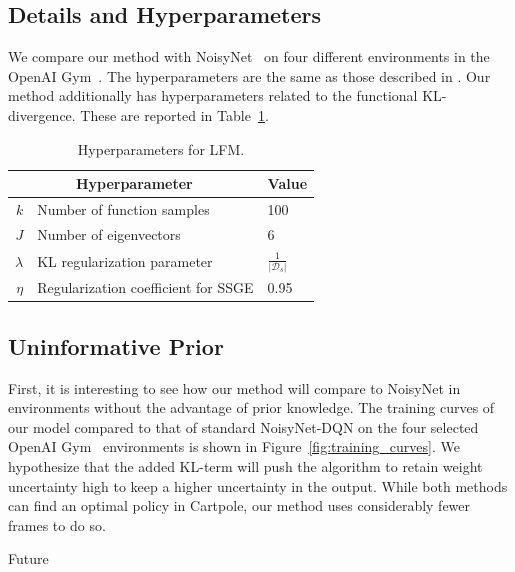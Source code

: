 \documentclass[]{uai2022} %
\begin{document}
\subsection{Details and Hyperparameters}
We compare our method with NoisyNet~\citep{fortunato_noisy_2019} on four different
environments in the OpenAI Gym~\citep{brockman_openai_2016-2}. The hyperparameters
are the same as those described in \cite{han_nrowan-dqn_2020}. Our method additionally
has hyperparameters related to the functional KL-divergence. These are reported in
Table~\ref{tab:hyperparams}.

\begin{table}
    \centering
    \caption{Hyperparameters for LFM.}\label{tab:hyperparams}
    \begin{tabular}{rll}
      \toprule %
      \multicolumn{2}{c}{Hyperparameter} & Value \\
      \midrule %
      \(k\)         & Number of function samples & 100\\
      \(J\)         & Number of eigenvectors & 6\\
      \(\lambda\)   & KL regularization parameter & \(\frac{1}{\lvert \mathcal{D}_s \rvert}\)\\
      \(\eta\)      & Regularization coefficient for SSGE & 0.95\\
      \bottomrule %
    \end{tabular}
\end{table}


\subsection{Uninformative Prior}
First, it is interesting to see how our method will compare to NoisyNet
in environments without the advantage of prior knowledge. The training curves
of our model compared to that of standard NoisyNet-DQN on the four selected OpenAI
Gym~\citep{brockman_openai_2016} environments is shown in Figure~\ref{fig:training_curves}.
We hypothesize that the added KL-term will push the algorithm to retain weight uncertainty high
to keep a higher uncertainty in the output. While both methods can
find an optimal policy in Cartpole, our method uses considerably fewer frames
to do so.

Future 
\end{document}
